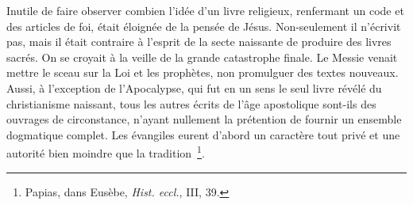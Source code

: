 \documentclass[french,twoside]{book} %
\begin{document}
Inutile de faire observer combien l’idée d’un livre religieux, renfermant un code et des articles de foi, était éloignée de la pensée de Jésus. Non-seulement il n’écrivit pas, mais il était contraire à l’esprit de la secte naissante de produire des livres sacrés. On se croyait à la veille de la grande catastrophe finale. Le Messie venait mettre le sceau sur la Loi et les prophètes, non promulguer des textes nouveaux. Aussi, à l’exception de l’Apocalypse, qui fut en un sens le seul livre révélé du christianisme naissant, tous les autres écrits de l’âge apostolique sont-ils des ouvrages de circonstance, n’ayant nullement la prétention de fournir un ensemble dogmatique complet. Les évangiles eurent d’abord un caractère tout privé et une autorité bien moindre que la tradition \footnote{ Papias, dans Eusèbe, {\itshape Hist. eccl.}, III, 39.}.\par
\end{document}
